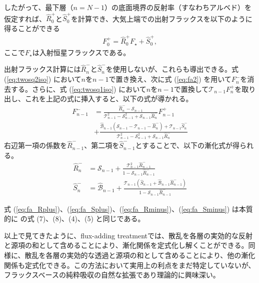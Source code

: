 したがって、最下層（$n=N-1$）の底面境界の反射率（すなわちアルベド）を仮定すれば、$\hat{R}^+_0$と$\hat{S}^+_0$を計算でき、大気上端での出射フラックスを以下のように得ることができる
\begin{align}
    F_0^+ = \hat{R}^+_0 F_\star + \hat{S}^+_0,
\end{align}
ここで$F_\star$は入射恒星フラックスである。

出射フラックス計算には$\hat{R}^-_n$と$\hat{S}^-_n$を使用しないが、これらも導出できる。式 (\ref{eq:twosq2iso}) において$n$を$n-1$で置き換え、次に式 (\ref{eq:fa2}) を用いて$F_n^-$を消去する。さらに、式 (\ref{eq:twosq1iso}) において$n$を$n-1$で置換して$\mathcal{T}_{n-1} F_n^+$を取り出し、これを上記の式に挿入すると、以下の式が導かれる。
\begin{align}
    \label{eq:recursive_fa2}
    F_{n-1}^- &= \frac{\hat{R}_n^- - \mathcal{S}_{n-1}}{  \mathcal{T}_{n-1}^2 -\mathcal{S}_{n-1}^2 +  \mathcal{S}_{n-1} \hat{R}_n^-} F_{n-1}^+ \nonumber \\
    &+ \frac{\hat{\mathcal{B}}_{n-1}(\mathcal{S}_{n-1} - \mathcal{T}_{n-1}- \hat{R}_n^- ) + \mathcal{T}_{n-1} \hat{S}_n^-}{  \mathcal{T}_{n-1}^2 -\mathcal{S}_{n-1}^2 +  \mathcal{S}_{n-1} \hat{R}_n^-}
\end{align}
右辺第一項の係数を$\hat{R}_{n-1}^-$、第二項を$\hat{S}_{n-1}^-$とすることで、以下の漸化式が得られる。
\begin{align}
    \label{eq:fa_Rminus}
    \hat{R}_n^- &= \mathcal{S}_{n-1} + \frac{\mathcal{T}_{n-1}^2 \hat{R}_{n-1}^-}{1 - \mathcal{S}_{n-1} \hat{R}_{n-1}^-} \\
    \label{eq:fa_Sminus}
    \hat{S}_n^- &= \hat{\mathcal{B}}_{n-1} + \frac{\mathcal{T}_{n-1} (\hat{S}_{n-1} + \hat{\mathcal{B}}_{n-1} \hat{R}_{n-1}^-)}{1 - \mathcal{S}_{n-1} \hat{R}_{n-1}^-}
\end{align}

式 (\ref{eq:fa_Rplus})、(\ref{eq:fa_Splus})、(\ref{eq:fa_Rminus})、(\ref{eq:fa_Sminus}) は本質的に \cite{2018JQSRT.211...78R} の式 (7)、(8)、(4)、(5) と同じである。

以上で見てきたように、flux-adding treatmentでは、散乱を各層の実効的な反射と源項の和として含めることにより、漸化関係を定式化し解くことができる。同様に、散乱を各層の実効的な透過と源項の和として含めることにより、他の漸化関係も定式化できる。この方法において実用上の利点をまだ特定していないが、フラックスベースの純粋吸収の自然な拡張であり理論的に興味深い。

